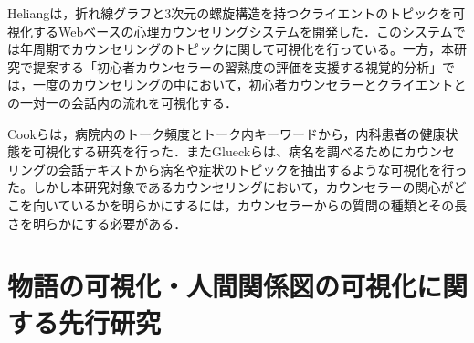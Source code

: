 \documentclass[shuuron]{kuee}
\begin{document}






Heliang\cite{shou}は，折れ線グラフと3次元の螺旋構造を持つクライエントのトピックを可視化するWebベースの心理カウンセリングシステムを開発した．このシステムでは年周期でカウンセリングのトピックに関して可視化を行っている。一方，本研究で提案する「初心者カウンセラーの習熟度の評価を支援する視覚的分析」では，一度のカウンセリングの中において，初心者カウンセラーとクライエントとの一対一の会話内の流れを可視化する．

Cookら\cite{cook2014monologger}は，病院内のトーク頻度とトーク内キーワードから，内科患者の健康状態を可視化する研究を行った．またGlueckら\cite{glueck2018phenolines}は、病名を調べるためにカウンセリングの会話テキストから病名や症状のトピックを抽出するような可視化を行った。しかし本研究対象であるカウンセリングにおいて，カウンセラーの関心がどこを向いているかを明らかにするには，カウンセラーからの質問の種類とその長さを明らかにする必要がある．



\section{物語の可視化・人間関係図の可視化に関する先行研究}%
\end{document}
